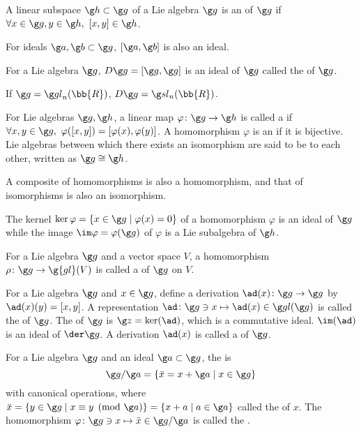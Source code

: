 A linear subspace $\g h \subset \g g$ of a Lie algebra $\g g$ is an  of $\g g$ if $\forall x \in \g g, y \in \g h,\ [x,y] \in \g h$.

For ideals $\g a, \g b \subset \g g$, $[\g a, \g b]$ is also an ideal.

For a Lie algebra $\g g$, $D\g g = [\g g, \g g]$ is an ideal of $\g g$ called the  of $\g g$.

If $\g g = \gl_n(\bb{R})$, $D\g g = \sl_n(\bb{R})$.

For Lie algebras $\g g, \g h$, a linear map $\varphi \colon \g g \to \g h$ is called a  if $\forall x, y \in \g g,\ \varphi([x,y]) = [\varphi(x), \varphi(y)]$. A homomorphism $\varphi$ is an  if it is bijective. Lie algebras between which there exists an isomorphism are said to be  to each other, written as $\g g \cong \g h$.

A composite of homomorphisms is also a homomorphism, and that of isomorphisms is also an isomorphism.

The kernel $\ker \varphi = \{ x \in \g g \mid \varphi(x) = 0 \}$ of a homomorphism $\varphi$ is an ideal of $\g g$ while the image $\im \varphi = \varphi(\g g)$ of $\varphi$ is a Lie subalgebra of $\g h$.

For a Lie algebra $\g g$ and a vector space $V$, a homomorphism $\rho \colon \g g \to \g{gl}(V)$ is called a  of $\g g$ on $V$.

For a Lie algebra $\g g$ and $x \in \g g$, define a derivation $\ad (x) \colon \g g \to \g g$ by $\ad(x)(y) = [x,y]$. A representation $\ad \colon \g g \ni x \mapsto \ad(x) \in \gl (\g g)$ is called the  of $\g g$. The  of $\g g$ is $\g z = \ker(\ad)$, which is a commutative ideal. $\im(\ad)$ is an ideal of $\der \g g$. A derivation $\ad(x)$ is called a  of $\g g$.

For a Lie algebra $\g g$ and an ideal $\g a \subset \g g$, the  is
\[
\g g / \g a = \{ \bar x = x + \g a \mid x \in \g g \}
\]
with canonical operations, where $\bar x = \{ y \in \g g \mid x \equiv y \pmod{\g a} \} = \{ x + a \mid a \in \g a \}$ called the  of $x$. The homomorphism $\varphi \colon \g g \ni x \mapsto \bar x \in \g g / \g a$ is called the .

